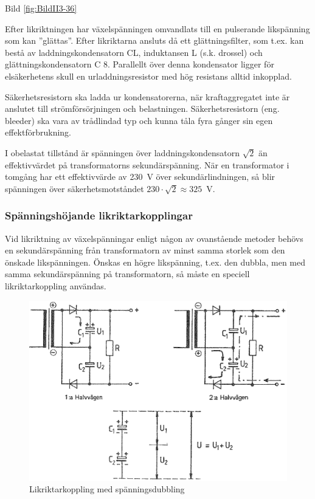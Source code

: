 Bild \ref{fig:BildII3-36}

Efter likriktningen har växelspänningen omvandlats till en pulserande
likspänning som kan ''glättas''. Efter likriktarna ansluts då ett
glättningsfilter, som t.ex. kan bestå av laddningskondensatorn CL,
induktansen L (s.k. drossel) och glättningskondensatorn C 8.
Parallellt över denna kondensator ligger för elsäkerhetens skull en
urladdningsresistor med hög resistans alltid inkopplad.

Säkerhetsresistorn ska ladda ur kondensatorerna, när kraftaggregatet
inte är anslutet till strömförsörjningen och
belastningen. Säkerhetsresistorn (eng. bleeder) ska vara av
trådlindad typ och kunna tåla fyra gånger sin egen effektförbrukning.

I obelastat tillstånd är spänningen över laddningskondensatorn
\(\sqrt{2}\) än effektivvärdet på transformatorns
sekundärspänning. När en transformator i tomgång har ett effektivvärde
av 230~V över sekundärlindningen, så blir spänningen över
säkerhetsmotståndet \(230\cdot\sqrt{2} \approx 325\)~V.

\subsubsection{Spänningshöjande likriktarkopplingar}

Vid likriktning av växelspänningar enligt någon av ovanstående metoder
behövs en sekundärspänning från transformatorn av minst samma storlek
som den önskade likspänningen. Önskas en högre likspänning, t.ex. den
dubbla, men med samma sekundärspänning på transformatorn, så måste en
speciell likriktarkoppling användas.

\begin{figure}
\includegraphics[width=\textwidth]{images/cropped_pdfs/bild_2_3-37.pdf}
\caption{Likriktarkoppling med spänningsdubbling}
\label{fig:BildII3-37}
\end{figure}

